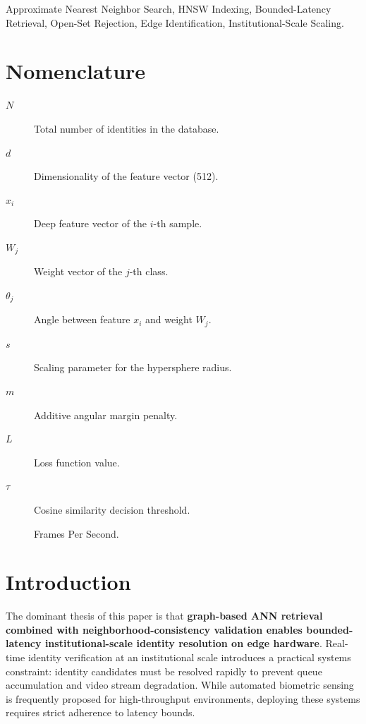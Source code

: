 \documentclass[conference]{IEEEtran}
\begin{document}
\begin{IEEEkeywords}
Approximate Nearest Neighbor Search, HNSW Indexing, Bounded-Latency Retrieval, Open-Set Rejection, Edge Identification, Institutional-Scale Scaling.
\end{IEEEkeywords}

\section*{Nomenclature}
\begin{description}
    \item[$N$] Total number of identities in the database.
    \item[$d$] Dimensionality of the feature vector (512).
    \item[$x_i$] Deep feature vector of the $i$-th sample.
    \item[$W_j$] Weight vector of the $j$-th class.
    \item[$\theta_j$] Angle between feature $x_i$ and weight $W_j$.
    \item[$s$] Scaling parameter for the hypersphere radius.
    \item[$m$] Additive angular margin penalty.
    \item[$L$] Loss function value.
    \item[$\tau$] Cosine similarity decision threshold.
    \item[] Frames Per Second.
\end{description}

\section{Introduction}

The dominant thesis of this paper is that \textbf{graph-based ANN retrieval combined with neighborhood-consistency validation enables bounded-latency institutional-scale identity resolution on edge hardware}. Real-time identity verification at an institutional scale introduces a practical systems constraint: identity candidates must be resolved rapidly to prevent queue accumulation and video stream degradation. While automated biometric sensing is frequently proposed for high-throughput environments, deploying these systems requires strict adherence to latency bounds.
\end{document}
